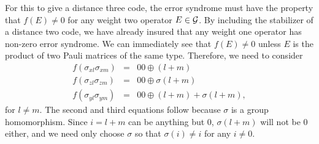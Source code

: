 \documentclass{report}
\newcommand{\G}{{\cal G}}
\newcommand{\Xs}[1]{\sigma_{x{#1}}}
\newcommand{\Ys}[1]{\sigma_{y{#1}}}
\newcommand{\Zs}[1]{\sigma_{z{#1}}}
\begin{document}
For this to give a distance three code, the error syndrome must have the 
property that $f(E) \neq 0$ for any weight two operator $E \in \G$.  By 
including the stabilizer of a distance two code, we have already insured that 
any weight one operator has non-zero error syndrome.  We can immediately 
see that $f(E) \neq 0$ unless $E$ is the product of two Pauli 
matrices of the same type.  Therefore, we need to consider
\begin{eqnarray}
f(\Xs{l} \Xs{m}) & = & 00 \oplus (l+m) \\
f(\Zs{l} \Zs{m}) & = & 00 \oplus \sigma (l+m) \\
f(\Ys{l} \Ys{m}) & = & 00 \oplus (l+m) + \sigma (l+m),
\end{eqnarray}
for $l \neq m$.  The second and third equations follow because 
$\sigma$ is a group homomorphism.  Since $i = l+m$ can be anything but $0$, 
$\sigma (l+m)$ will not be $0$ either, and we need only choose $\sigma$ 
so that $\sigma (i) \neq i$ for any $i \neq 0$.
\end{document}
